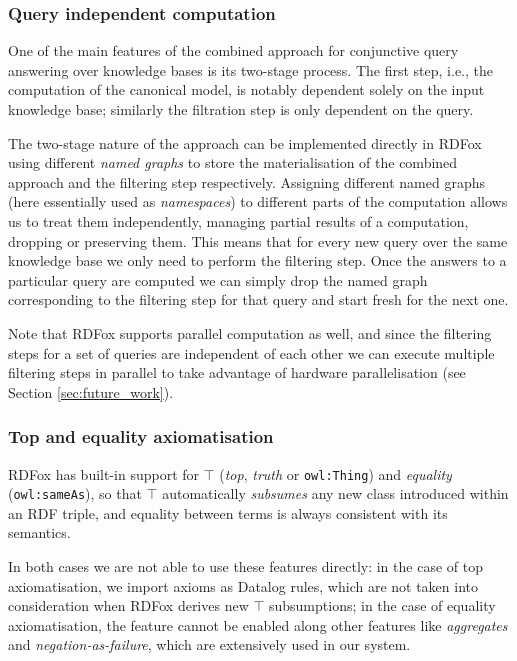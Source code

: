 \documentclass[runningheads]{llncs}
\newcommand{\rdfox}{\mbox{RDFox}\xspace}
\newcommand{\datalog}{\mbox{Datalog}\xspace}
\begin{document}
\subsubsection{Query independent computation}\label{sssec:query_independent_computation}

One of the main features of the combined approach for conjunctive query answering over knowledge bases is its two-stage process.
The first step, i.e., the computation of the canonical model, is notably dependent solely on the input knowledge base;
similarly the filtration step is only dependent on the query.

The two-stage nature of the approach can be implemented directly in \rdfox using different \emph{named graphs} to store the materialisation of the combined approach and the filtering step respectively.
Assigning different named graphs (here essentially used as \emph{namespaces}) to different parts of the computation allows us to treat them independently, managing partial results of a computation, dropping or preserving them.
This means that for every new query over the same knowledge base we only need to perform the filtering step.
Once the answers to a particular query are computed we can simply drop the named graph corresponding to the filtering step for that query and start fresh for the next one.

Note that \rdfox supports parallel computation as well, and since the filtering steps for a set of queries are independent of each other we can execute multiple filtering steps in parallel to take advantage of hardware parallelisation (see Section \ref{sec:future_work}).

\subsubsection{Top and equality axiomatisation}\label{sssec:top_axiomatisation}

\rdfox has built-in support for $\top$ (\emph{top}, \emph{truth} or \texttt{owl:Thing}) and \emph{equality} (\texttt{owl:sameAs}), so that $\top$ automatically \emph{subsumes} any new class introduced within an RDF triple, and equality between terms is always consistent with its semantics.

In both cases we are not able to use these features directly: in the case of top axiomatisation, we import axioms as \datalog rules, which are not taken into consideration when \rdfox derives new $\top$ subsumptions; in the case of equality axiomatisation, the feature cannot be enabled along other features like \emph{aggregates} and \emph{negation-as-failure}, which are extensively used in our system.
\end{document}
